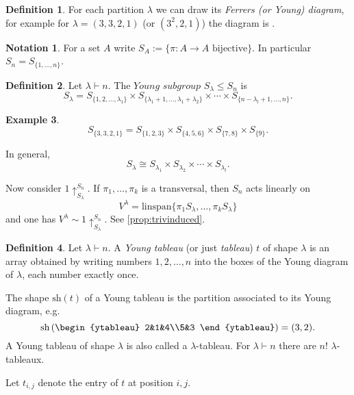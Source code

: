 \documentclass{article}
\newcommand{\linspan}{\text{linspan}}
\newcommand{\sh}{\text{sh}}
\theoremstyle{definition}
\newtheorem{defn}{Definition}[subsection]
\newtheorem{example}[defn]{Example}
\newtheorem*{notation}{Notation}
\begin{document}
\begin{defn}
For each partition $\lambda$ we can draw its \textit{Ferrers (or Young) diagram}, for example for $\lambda=(3,3,2,1)$ (or $(3^2,2,1)$) the diagram is .
\end{defn}

\begin{notation}
For a set $A$ write $S_A:=\{\pi:A\rightarrow A\text{ bijective}\}$. In particular $S_n=S_{\{1,\ldots,n\}}$.
\end{notation}

\begin{defn}
Let $\lambda\vdash n$. The $\textit{Young subgroup}$ $S_\lambda\leq S_n$ is
\[
S_\lambda=S_{\{1,2,\ldots,\lambda_1\}}\times S_{\{\lambda_1+1,\ldots,\lambda_1+\lambda_2\}}\times\cdots\times S_{\{n-\lambda_l+1,\ldots,n\}}.
\]
\end{defn}
\begin{example}
\[
S_{\{3,3,2,1\}}=S_{\{1,2,3\}}\times S_{\{4,5,6\}}\times S_{\{7,8\}}\times S_{\{9\}}.
\]

In general,
\[
S_\lambda\cong S_{\lambda_1}\times S_{\lambda_2}\times\cdots\times S_{\lambda_l}.
\]
\end{example}

Now consider $1\uparrow_{S_\lambda}^{S_n}$. If $\pi_1,\ldots,\pi_k$ is a transversal, then $S_n$ acts linearly on
\[
V^\lambda=\linspan\{\pi_1 S_\lambda,\ldots,\pi_k S_\lambda\}
\]
and one has $V^\lambda\sim 1\uparrow_{S_\lambda}^{S_n}$. See \ref{prop:trivinduced}.

\begin{defn}
Let $\lambda\vdash n$. A \textit{Young tableau} (or just \textit{tableau}) $t$ of shape $\lambda$ is an array obtained by writing numbers $1,2,\ldots,n$ into the boxes of the Young diagram of $\lambda$, each number exactly once.

The shape $\sh(t)$ of a Young tableau is the partition associated to its Young diagram, e.g.
\[
\sh\left(\begin{ytableau}
  2&1&4\\5&3
\end{ytableau}\right)=(3,2).
\]
A Young tableau of shape $\lambda$ is also called a $\lambda$-tableau. For $\lambda\vdash n$ there are $n!$ $\lambda$-tableaux.

Let $t_{i,j}$ denote the entry of $t$ at position $i,j$.
\end{defn}
\end{document}
